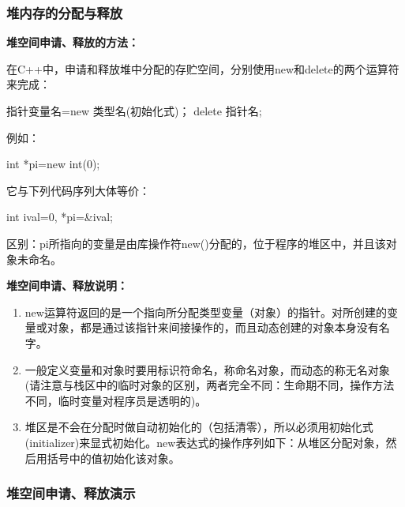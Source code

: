 \subsubsection{堆内存的分配与释放}
\textbf{堆空间申请、释放的方法：}

在C++中，申请和释放堆中分配的存贮空间，分别使用new和delete的两个运算符来完成：

\begin{Code}
指针变量名=new 类型名(初始化式)；
delete 指针名;
\end{Code}
例如：
\begin{Code}
int *pi=new int(0);
\end{Code}

它与下列代码序列大体等价：
\begin{Code}
int ival=0, *pi=&ival;
\end{Code}
区别：pi所指向的变量是由库操作符new()分配的，位于程序的堆区中，并且该对象未命名。　　

\textbf{堆空间申请、释放说明：}

\begin{enumerate}
	\item new运算符返回的是一个指向所分配类型变量（对象）的指针。对所创建的变量或对象，都是通过该指针来间接操作的，而且动态创建的对象本身没有名字。
	\item 一般定义变量和对象时要用标识符命名，称命名对象，而动态的称无名对象(请注意与栈区中的临时对象的区别，两者完全不同：生命期不同，操作方法不同，临时变量对程序员是透明的)。
	\item 堆区是不会在分配时做自动初始化的（包括清零），所以必须用初始化式(initializer)来显式初始化。new表达式的操作序列如下：从堆区分配对象，然后用括号中的值初始化该对象。
\end{enumerate}

\subsubsection{堆空间申请、释放演示}

